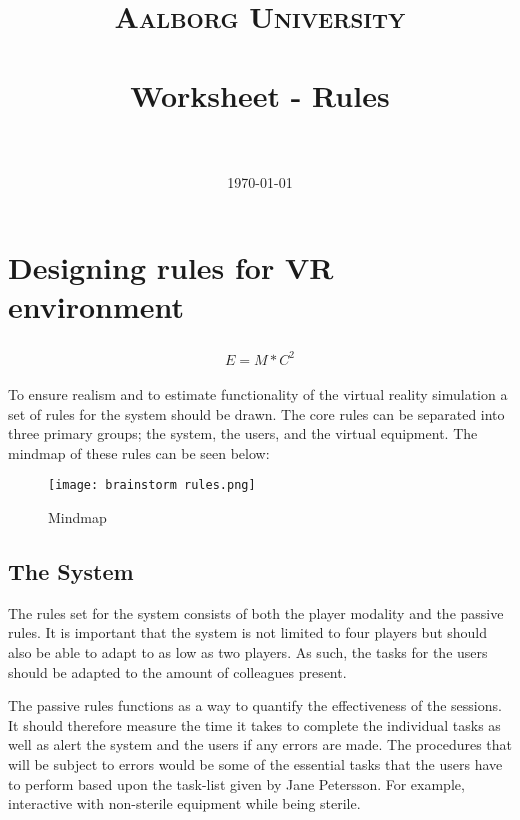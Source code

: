 \documentclass[paper=a4, fontsize=11pt]{scrartcl} %
\title{	
\normalfont \normalsize 
\textsc{Aalborg University} \\ [25pt] %
\horrule{0.5pt} \\[0.4cm] %
\huge Worksheet - Rules \\ %
\horrule{2pt} \\[0.5cm] %
}
\date{\normalsize\today} %
\numberwithin{equation}{section} %
\numberwithin{figure}{section} %
\numberwithin{table}{section} %
\begin{document}
\maketitle %


\section{Designing rules for VR environment}


\begin{align} 
\begin{split}
E = M * C^2
\end{split}					
\end{align}

To ensure realism and to estimate functionality of the virtual reality simulation a set of rules for the system should be drawn. The core rules can be separated into three primary groups; the system, the users, and the virtual equipment. The mindmap of these rules can be seen below:

\begin{figure}
\texttt{[image: brainstorm rules.png]}
\caption{Mindmap}
\label{fig:Rules}
\end{figure}

\subsection{The System}
The rules set for the system consists of both the player modality and the passive rules. It is important that the system is not limited to four players but should also be able to adapt to as low as two players. As such, the tasks for the users should be adapted to the amount of colleagues present.

The passive rules functions as a way to quantify the effectiveness of the sessions. It should therefore measure the time it takes to complete the individual tasks as well as alert the system and the users if any errors are made. The procedures that will be subject to errors would be some of the essential tasks that the users have to perform based upon the task-list given by Jane Petersson. For example, interactive with non-sterile equipment while being sterile.
\end{document}
